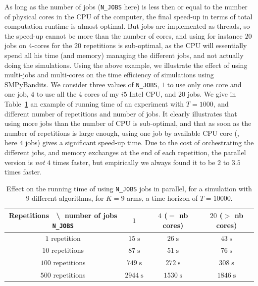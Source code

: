 {As long as the number of jobs (\texttt{N\_JOBS} here) is less then or equal to the number of physical cores in the CPU of the computer, the final speed-up in terms of total computation runtime is almost optimal.
But jobs are implemented as threads, so the speed-up cannot be more than the number of cores, and using for instance $20$ jobs on $4$-cores for the $20$ repetitions is sub-optimal, as the CPU will essentially spend all his time (and memory) managing the different jobs, and not actually doing the simulations.
Using the above example, we illustrate the effect of using multi-jobs and multi-cores on the time efficiency of simulations using SMPyBandits. We consider three values of \texttt{N\_JOBS}, $1$ to use only one core and one job, $4$ to use all the $4$ cores of my $i5$ Intel CPU, and $20$ jobs.
We give in Table~\ref{table:3:speedUpTimeParallelComputations} an example of running time of an experiment with $T=1000$, and different number of repetitions and number of jobs.
It clearly illustrates that using more jobs than the number of CPU is sub-optimal, and that as soon as the number of repetitions is large enough, using one job by available CPU core (\ie, here $4$ jobs) gives a significant speed-up time.
Due to the cost of orchestrating the different jobs, and memory exchanges at the end of each repetition, the parallel version is \emph{not} $4$ times faster, but empirically we always found it to be $2$ to $3.5$ times faster.


\begin{table}[ht]
    \centering
    \begin{tabular}{c|ccc}
    \textbf{Repetitions} $\;$ \textbackslash $\;$ number of jobs \texttt{N\_JOBS} & $1$ & $4$ ($=$ nb cores) & $20$ ($>$ nb cores) \\
        \hline
        $1$ repetition    & $15 \;\text{s}$ & $26 \;\text{s}$ & $43 \;\text{s}$ \\
        $10$ repetitions  & $87 \;\text{s}$ & $51 \;\text{s}$ & $76 \;\text{s}$ \\
        $100$ repetitions & $749 \;\text{s}$ & $272 \;\text{s}$ & $308 \;\text{s}$ \\
        $500$ repetitions & $2944 \;\text{s}$ & $1530 \;\text{s}$ & $1846 \;\text{s}$ \\
        \hline
    \end{tabular}
    \caption{Effect on the running time of using \texttt{N\_JOBS} jobs in parallel, for a simulation with $9$ different algorithms, for $K=9$ arms, a time horizon of $T=10000$.}
    \label{table:3:speedUpTimeParallelComputations}
\end{table}


}
